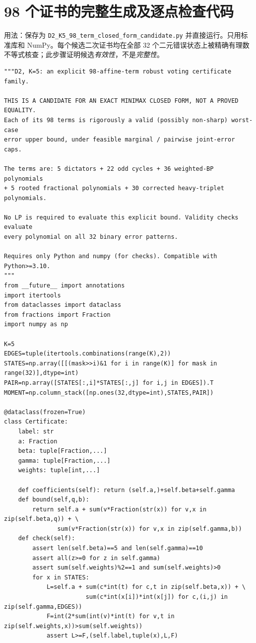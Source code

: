 \documentclass[11pt,a4paper]{ctexart}
\theoremstyle{definition}
\begin{document}
\section{98 个证书的完整生成及逐点检查代码}
\noindent 用法：保存为 \texttt{D2\_K5\_98\_term\_closed\_form\_candidate.py} 并直接运行。只用标准库和 NumPy。每个候选二次证书均在全部 32 个二元错误状态上被精确有理数不等式核查；此步骤证明候选\emph{有效性}，不是\emph{完整性}。
\begin{lstlisting}
"""D2, K=5: an explicit 98-affine-term robust voting certificate family.

THIS IS A CANDIDATE FOR AN EXACT MINIMAX CLOSED FORM, NOT A PROVED EQUALITY.
Each of its 98 terms is rigorously a valid (possibly non-sharp) worst-case
error upper bound, under feasible marginal / pairwise joint-error caps.

The terms are: 5 dictators + 22 odd cycles + 36 weighted-BP polynomials
+ 5 rooted fractional polynomials + 30 corrected heavy-triplet polynomials.

No LP is required to evaluate this explicit bound. Validity checks evaluate
every polynomial on all 32 binary error patterns.

Requires only Python and numpy (for checks). Compatible with Python>=3.10.
"""
from __future__ import annotations
import itertools
from dataclasses import dataclass
from fractions import Fraction
import numpy as np

K=5
EDGES=tuple(itertools.combinations(range(K),2))
STATES=np.array([[(mask>>i)&1 for i in range(K)] for mask in range(32)],dtype=int)
PAIR=np.array([STATES[:,i]*STATES[:,j] for i,j in EDGES]).T
MOMENT=np.column_stack([np.ones(32,dtype=int),STATES,PAIR])

@dataclass(frozen=True)
class Certificate:
    label: str
    a: Fraction
    beta: tuple[Fraction,...]
    gamma: tuple[Fraction,...]
    weights: tuple[int,...]

    def coefficients(self): return (self.a,)+self.beta+self.gamma
    def bound(self,q,b):
        return self.a + sum(v*Fraction(str(x)) for v,x in zip(self.beta,q)) + \
               sum(v*Fraction(str(x)) for v,x in zip(self.gamma,b))
    def check(self):
        assert len(self.beta)==5 and len(self.gamma)==10
        assert all(z>=0 for z in self.gamma)
        assert sum(self.weights)%2==1 and sum(self.weights)>0
        for x in STATES:
            L=self.a + sum(c*int(t) for c,t in zip(self.beta,x)) + \
                       sum(c*int(x[i])*int(x[j]) for c,(i,j) in zip(self.gamma,EDGES))
            F=int(2*sum(int(v)*int(t) for v,t in zip(self.weights,x))>sum(self.weights))
            assert L>=F,(self.label,tuple(x),L,F)



\end{lstlisting}
\end{document}

